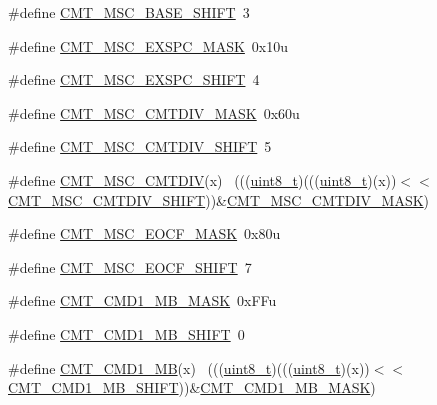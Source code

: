\begin{DoxyCompactItemize}
\item 
\#define \hyperlink{group___c_m_t___register___masks_ga3ddb10ae744a6e2149a0d0185a796571}{C\+M\+T\+\_\+\+M\+S\+C\+\_\+\+B\+A\+S\+E\+\_\+\+S\+H\+I\+FT}~3
\item 
\#define \hyperlink{group___c_m_t___register___masks_gafeb71169b6c47237583101487f6412e1}{C\+M\+T\+\_\+\+M\+S\+C\+\_\+\+E\+X\+S\+P\+C\+\_\+\+M\+A\+SK}~0x10u
\item 
\#define \hyperlink{group___c_m_t___register___masks_ga7a71704451408ca7e8c8802fa72d4e4d}{C\+M\+T\+\_\+\+M\+S\+C\+\_\+\+E\+X\+S\+P\+C\+\_\+\+S\+H\+I\+FT}~4
\item 
\#define \hyperlink{group___c_m_t___register___masks_gab663f14909462192c6e432c7bd0e56bf}{C\+M\+T\+\_\+\+M\+S\+C\+\_\+\+C\+M\+T\+D\+I\+V\+\_\+\+M\+A\+SK}~0x60u
\item 
\#define \hyperlink{group___c_m_t___register___masks_gad2d262cf3ba8ccd189bd321219579c52}{C\+M\+T\+\_\+\+M\+S\+C\+\_\+\+C\+M\+T\+D\+I\+V\+\_\+\+S\+H\+I\+FT}~5
\item 
\#define \hyperlink{group___c_m_t___register___masks_ga54610d66d9610fc9d93f47c16a2f052a}{C\+M\+T\+\_\+\+M\+S\+C\+\_\+\+C\+M\+T\+D\+IV}(x)                                            ~(((\hyperlink{_p_e___types_8h_aba7bc1797add20fe3efdf37ced1182c5}{uint8\+\_\+t})(((\hyperlink{_p_e___types_8h_aba7bc1797add20fe3efdf37ced1182c5}{uint8\+\_\+t})(x))$<$$<$\hyperlink{group___c_m_t___register___masks_gad2d262cf3ba8ccd189bd321219579c52}{C\+M\+T\+\_\+\+M\+S\+C\+\_\+\+C\+M\+T\+D\+I\+V\+\_\+\+S\+H\+I\+FT}))\&\hyperlink{group___c_m_t___register___masks_gab663f14909462192c6e432c7bd0e56bf}{C\+M\+T\+\_\+\+M\+S\+C\+\_\+\+C\+M\+T\+D\+I\+V\+\_\+\+M\+A\+SK})
\item 
\#define \hyperlink{group___c_m_t___register___masks_ga1aec1fa9b79d496b3f5f32fab07495a3}{C\+M\+T\+\_\+\+M\+S\+C\+\_\+\+E\+O\+C\+F\+\_\+\+M\+A\+SK}~0x80u
\item 
\#define \hyperlink{group___c_m_t___register___masks_gab505074d349c8d2c800e554a0893f312}{C\+M\+T\+\_\+\+M\+S\+C\+\_\+\+E\+O\+C\+F\+\_\+\+S\+H\+I\+FT}~7
\item 
\#define \hyperlink{group___c_m_t___register___masks_gae4b77d2880f04b69d33cacfe3978042a}{C\+M\+T\+\_\+\+C\+M\+D1\+\_\+\+M\+B\+\_\+\+M\+A\+SK}~0x\+F\+Fu
\item 
\#define \hyperlink{group___c_m_t___register___masks_ga8bbdd2644bc864f959170f9260981476}{C\+M\+T\+\_\+\+C\+M\+D1\+\_\+\+M\+B\+\_\+\+S\+H\+I\+FT}~0
\item 
\#define \hyperlink{group___c_m_t___register___masks_ga6768033295fb2ea10154824be36cb803}{C\+M\+T\+\_\+\+C\+M\+D1\+\_\+\+MB}(x)                                                  ~(((\hyperlink{_p_e___types_8h_aba7bc1797add20fe3efdf37ced1182c5}{uint8\+\_\+t})(((\hyperlink{_p_e___types_8h_aba7bc1797add20fe3efdf37ced1182c5}{uint8\+\_\+t})(x))$<$$<$\hyperlink{group___c_m_t___register___masks_ga8bbdd2644bc864f959170f9260981476}{C\+M\+T\+\_\+\+C\+M\+D1\+\_\+\+M\+B\+\_\+\+S\+H\+I\+FT}))\&\hyperlink{group___c_m_t___register___masks_gae4b77d2880f04b69d33cacfe3978042a}{C\+M\+T\+\_\+\+C\+M\+D1\+\_\+\+M\+B\+\_\+\+M\+A\+SK})

\end{DoxyCompactItemize}
